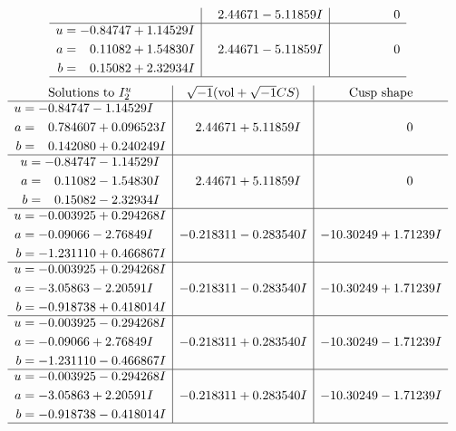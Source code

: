 \documentclass[1p]{elsarticle_modified}
\theoremstyle{definition}
\newcommand{\I}{\sqrt{-1}}
\begin{document}
$$\begin{array}{c|c|c}
 & \phantom{-}2.44671 - 5.11859 I & \phantom{-0.000000 } 0 \\ \hline\begin{aligned}
u &= -0.84747 + 1.14529 I \\
a &= \phantom{-}0.11082 + 1.54830 I \\
b &= \phantom{-}0.15082 + 2.32934 I\end{aligned}
 & \phantom{-}2.44671 - 5.11859 I & \phantom{-0.000000 } 0\\
 \hline 
 \end{array}$$\newpage$$\begin{array}{c|c|c}  
\text{Solutions to }I^u_{2}& \I (\text{vol} + \sqrt{-1}CS) & \text{Cusp shape}\\
 \hline 
\begin{aligned}
u &= -0.84747 - 1.14529 I \\
a &= \phantom{-}0.784607 + 0.096523 I \\
b &= \phantom{-}0.142080 + 0.240249 I\end{aligned}
 & \phantom{-}2.44671 + 5.11859 I & \phantom{-0.000000 } 0 \\ \hline\begin{aligned}
u &= -0.84747 - 1.14529 I \\
a &= \phantom{-}0.11082 - 1.54830 I \\
b &= \phantom{-}0.15082 - 2.32934 I\end{aligned}
 & \phantom{-}2.44671 + 5.11859 I & \phantom{-0.000000 } 0 \\ \hline\begin{aligned}
u &= -0.003925 + 0.294268 I \\
a &= -0.09066 - 2.76849 I \\
b &= -1.231110 + 0.466867 I\end{aligned}
 & -0.218311 - 0.283540 I & -10.30249 + 1.71239 I \\ \hline\begin{aligned}
u &= -0.003925 + 0.294268 I \\
a &= -3.05863 - 2.20591 I \\
b &= -0.918738 + 0.418014 I\end{aligned}
 & -0.218311 - 0.283540 I & -10.30249 + 1.71239 I \\ \hline\begin{aligned}
u &= -0.003925 - 0.294268 I \\
a &= -0.09066 + 2.76849 I \\
b &= -1.231110 - 0.466867 I\end{aligned}
 & -0.218311 + 0.283540 I & -10.30249 - 1.71239 I \\ \hline\begin{aligned}
u &= -0.003925 - 0.294268 I \\
a &= -3.05863 + 2.20591 I \\
b &= -0.918738 - 0.418014 I\end{aligned}
 & -0.218311 + 0.283540 I & -10.30249 - 1.71239 I\\
 \hline 
 \end{array}$$\newpage\newpage\renewcommand{\arraystretch}{1}
\end{document}
